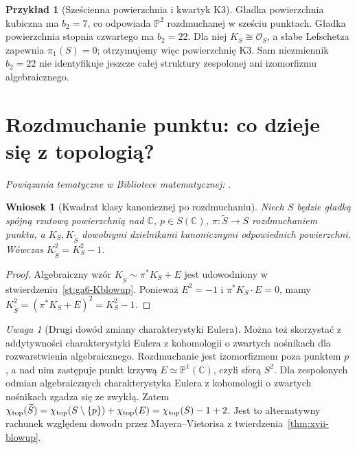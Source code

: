 \documentclass[11pt,a4paper,openany]{report}
\numberwithin{equation}{section}
\theoremstyle{plain}
\newtheorem{wniosek}[twierdzenie]{Wniosek}
\theoremstyle{definition}
\newtheorem{przyklad}[twierdzenie]{Przykład}
\theoremstyle{remark}
\newtheorem{uwaga}[twierdzenie]{Uwaga}
\newcommand{\C}{\mathbb C}
\newcommand{\PP}{\mathbb P}
\begin{document}
\begin{przyklad}[Sześcienna powierzchnia i kwartyk K3]
Gładka powierzchnia kubiczna ma $b_2=7$,
co odpowiada $\PP^2$ rozdmuchanej w sześciu punktach.
Gładka powierzchnia stopnia czwartego ma $b_2=22$.
Dla niej $K_S\cong\mathcal O_S$, a słabe Lefschetza
zapewnia $\pi_1(S)=0$; otrzymujemy więc powierzchnię K3.
Sam niezmiennik $b_2=22$ nie identyfikuje jeszcze całej
struktury zespolonej ani izomorfizmu algebraicznego.
\end{przyklad}

\section{Rozdmuchanie punktu: co dzieje się z topologią?}
\label{sec:ga10-blowup}

\noindent\emph{Powiązania tematyczne w Bibliotece matematycznej:} .




\begin{wniosek}[Kwadrat klasy kanonicznej po rozdmuchaniu]
\label{wn:ga10-blowup-canonical}
Niech $S$ będzie gładką spójną rzutową powierzchnią nad $\C$,
$p\in S(\C)$, $\pi:\widetilde S\to S$ rozdmuchaniem punktu,
a $K_S,K_{\widetilde S}$ dowolnymi dzielnikami kanonicznymi
odpowiednich powierzchni. Wówczas
$K_{\widetilde S}^2=K_S^2-1$.
\end{wniosek}
\begin{proof}
Algebraiczny wzór $K_{\widetilde S}\sim\pi^*K_S+E$ jest
udowodniony w stwierdzeniu~\ref{st:ga6-Kblowup}.
Ponieważ $E^2=-1$ i $\pi^*K_S\cdot E=0$, mamy
$K_{\widetilde S}^2=(\pi^*K_S+E)^2=K_S^2-1$.
\end{proof}

\begin{uwaga}[Drugi dowód zmiany charakterystyki Eulera]
Można też skorzystać z addytywności charakterystyki Eulera
z kohomologii o zwartych nośnikach dla rozwarstwienia algebraicznego.
Rozdmuchanie jest izomorfizmem poza punktem $p$, a nad nim zastępuje
punkt krzywą $E\simeq\mathbb P^1(\mathbb C)$, czyli sferą $S^2$.
Dla zespolonych odmian algebraicznych charakterystyka Eulera
z kohomologii o zwartych nośnikach zgadza się ze zwykłą.
Zatem
$\chi_{\rm top}(\widetilde S)=\chi_{\rm top}(S\setminus\{p\})
+\chi_{\rm top}(E)=\chi_{\rm top}(S)-1+2$.
Jest to alternatywny rachunek względem dowodu przez
Mayera--Vietorisa z twierdzenia~\ref{thm:xvii-blowup}.
\end{uwaga}
\end{document}

